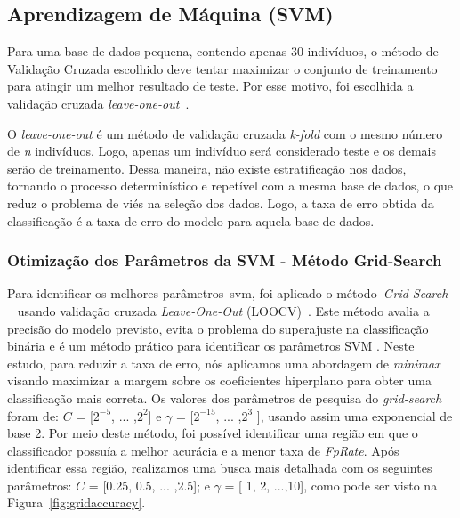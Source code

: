 \subsection{Aprendizagem de Máquina (SVM)}

Para uma base de dados pequena, contendo apenas 30 indivíduos, o método de Validação Cruzada escolhido deve tentar maximizar o conjunto de treinamento para atingir um melhor resultado de teste. Por esse motivo, foi escolhida a validação cruzada \textit{leave-one-out}~\cite{kantardzic2011data}. 

O \textit{leave-one-out} é um método de validação cruzada \textit{k-fold} com o mesmo número de \textit{n} indivíduos. Logo, apenas um indivíduo será considerado teste e os demais serão de treinamento. Dessa maneira, não existe estratificação nos dados, tornando o processo determinístico e repetível com a mesma base de dados, o que reduz o problema de viés na seleção dos dados. Logo, a taxa de erro obtida da classificação é a taxa de erro do modelo para aquela base de dados. 

\subsubsection{Otimização dos Parâmetros da SVM - Método Grid-Search}

Para identificar os melhores parâmetros~\ac{svm}, foi aplicado o método~\textit{Grid-Search} ~\cite{gridsearchsvm2010} usando validação cruzada \textit{Leave-One-Out} (LOOCV)~\cite{kantardzic2011data}. Este método avalia a precisão do modelo previsto, evita o problema do superajuste na classificação binária e é um método prático para identificar os parâmetros SVM . Neste estudo, para reduzir a taxa de erro, nós aplicamos uma abordagem de \textit{minimax} visando maximizar a margem sobre os coeficientes hiperplano para obter uma classificação mais correta. Os valores dos parâmetros de pesquisa do \textit{grid-search} foram de: $C$ = [$2^{-5}$, ... ,$2^2$] e $\gamma$ = [$2^{-15}$, ... ,$2^3$ ], usando assim uma exponencial de base 2. Por meio deste método, foi possível identificar uma região em que o classificador possuía a melhor acurácia e a menor taxa de \textit{FpRate}. Após identificar essa região, realizamos uma busca mais detalhada com os seguintes parâmetros: $C$ = [0.25, 0.5, ... ,2.5]; e $\gamma$ = [
1, 2,
 ...,10], como pode ser visto na Figura~\ref{fig:gridaccuracy}.


